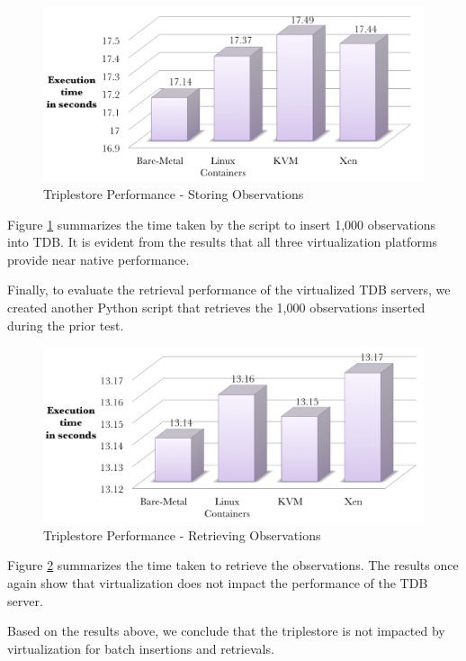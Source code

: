 \begin{figure}[H]
\centering
\includegraphics[width=150mm]{3storeins.png}
\caption{Triplestore Performance - Storing Observations}
\label{fig:3storeins}
\end{figure}

Figure \ref{fig:3storeins} summarizes the time taken by the script to insert 1,000 observations into TDB. It is evident from the results that all three virtualization platforms provide near native performance. 

Finally, to evaluate the retrieval performance of the virtualized TDB servers, we created another Python script that retrieves the 1,000 observations inserted during the prior test. 

\begin{figure}[H]
\centering
\includegraphics[width=150mm]{3storeret.png}
\caption{Triplestore Performance - Retrieving Observations}
\label{fig:3storeret}
\end{figure}

Figure \ref{fig:3storeret} summarizes the time taken to retrieve the observations. The results once again show that virtualization does not impact the performance of the TDB server.

Based on the results above, we conclude that the triplestore is not impacted by virtualization for batch insertions and retrievals.


